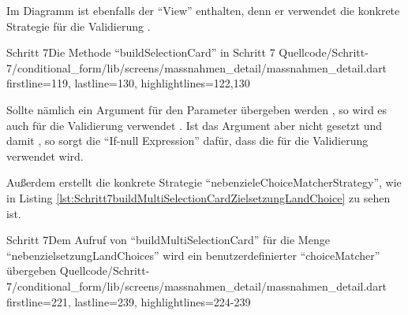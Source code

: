 Im Diagramm ist ebenfalls der \enquote{View}  enthalten,
denn er verwendet die konkrete Strategie  für die Validierung \Lst{\ref{lst:Schritt7buildSelectionCard}}.

\begin{alexlisting}{Schritt 7}{Die Methode \enquote{buildSelectionCard} in Schritt 7}
  {Quellcode/Schritt-7/conditional_form/lib/screens/massnahmen_detail/massnahmen_detail.dart}
  {firstline=119, lastline=130, highlightlines={122,130}}
  \label{lst:Schritt7buildSelectionCard}
\end{alexlisting}

Sollte nämlich ein Argument für den Parameter  übergeben werden ,
so wird es auch für die Validierung verwendet .
Ist das Argument aber nicht gesetzt und damit ,
so sorgt die \enquote{If-null Expression} dafür,
dass die  für die Validierung verwendet wird.

Außerdem erstellt  die konkrete Strategie \enquote{nebenzieleChoiceMatcherStrategy}, wie in Listing \ref{lst:Schritt7buildMultiSelectionCardZielsetzungLandChoice} zu sehen ist.

\begin{alexlisting}{Schritt 7}{Dem Aufruf von \enquote{buildMultiSelectionCard} für die Menge \enquote{nebenzielsetzungLandChoices} wird ein benutzerdefinierter \enquote{choiceMatcher} übergeben}
  {Quellcode/Schritt-7/conditional_form/lib/screens/massnahmen_detail/massnahmen_detail.dart}
  {firstline=221, lastline=239, highlightlines={224-239}}
  \label{lst:Schritt7buildMultiSelectionCardZielsetzungLandChoice}
\end{alexlisting}

